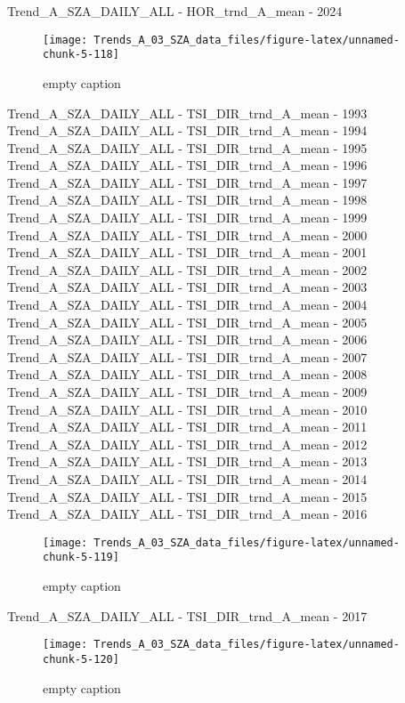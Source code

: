\documentclass[
  10pt,
  a4paper,oneside]{article}
\begin{document}
Trend\_A\_SZA\_DAILY\_ALL - HOR\_trnd\_A\_mean - 2024

\begin{figure}[!ht]

{\centering \texttt{[image: Trends\_A\_03\_SZA\_data\_files/figure-latex/unnamed-chunk-5-118]} 

}

\caption{ empty caption }\label{fig:unnamed-chunk-5-118}
\end{figure}

Trend\_A\_SZA\_DAILY\_ALL - TSI\_DIR\_trnd\_A\_mean - 1993
Trend\_A\_SZA\_DAILY\_ALL - TSI\_DIR\_trnd\_A\_mean - 1994
Trend\_A\_SZA\_DAILY\_ALL - TSI\_DIR\_trnd\_A\_mean - 1995
Trend\_A\_SZA\_DAILY\_ALL - TSI\_DIR\_trnd\_A\_mean - 1996
Trend\_A\_SZA\_DAILY\_ALL - TSI\_DIR\_trnd\_A\_mean - 1997
Trend\_A\_SZA\_DAILY\_ALL - TSI\_DIR\_trnd\_A\_mean - 1998
Trend\_A\_SZA\_DAILY\_ALL - TSI\_DIR\_trnd\_A\_mean - 1999
Trend\_A\_SZA\_DAILY\_ALL - TSI\_DIR\_trnd\_A\_mean - 2000
Trend\_A\_SZA\_DAILY\_ALL - TSI\_DIR\_trnd\_A\_mean - 2001
Trend\_A\_SZA\_DAILY\_ALL - TSI\_DIR\_trnd\_A\_mean - 2002
Trend\_A\_SZA\_DAILY\_ALL - TSI\_DIR\_trnd\_A\_mean - 2003
Trend\_A\_SZA\_DAILY\_ALL - TSI\_DIR\_trnd\_A\_mean - 2004
Trend\_A\_SZA\_DAILY\_ALL - TSI\_DIR\_trnd\_A\_mean - 2005
Trend\_A\_SZA\_DAILY\_ALL - TSI\_DIR\_trnd\_A\_mean - 2006
Trend\_A\_SZA\_DAILY\_ALL - TSI\_DIR\_trnd\_A\_mean - 2007
Trend\_A\_SZA\_DAILY\_ALL - TSI\_DIR\_trnd\_A\_mean - 2008
Trend\_A\_SZA\_DAILY\_ALL - TSI\_DIR\_trnd\_A\_mean - 2009
Trend\_A\_SZA\_DAILY\_ALL - TSI\_DIR\_trnd\_A\_mean - 2010
Trend\_A\_SZA\_DAILY\_ALL - TSI\_DIR\_trnd\_A\_mean - 2011
Trend\_A\_SZA\_DAILY\_ALL - TSI\_DIR\_trnd\_A\_mean - 2012
Trend\_A\_SZA\_DAILY\_ALL - TSI\_DIR\_trnd\_A\_mean - 2013
Trend\_A\_SZA\_DAILY\_ALL - TSI\_DIR\_trnd\_A\_mean - 2014
Trend\_A\_SZA\_DAILY\_ALL - TSI\_DIR\_trnd\_A\_mean - 2015
Trend\_A\_SZA\_DAILY\_ALL - TSI\_DIR\_trnd\_A\_mean - 2016

\begin{figure}[!ht]

{\centering \texttt{[image: Trends\_A\_03\_SZA\_data\_files/figure-latex/unnamed-chunk-5-119]} 

}

\caption{ empty caption }\label{fig:unnamed-chunk-5-119}
\end{figure}

Trend\_A\_SZA\_DAILY\_ALL - TSI\_DIR\_trnd\_A\_mean - 2017

\begin{figure}[!ht]

{\centering \texttt{[image: Trends\_A\_03\_SZA\_data\_files/figure-latex/unnamed-chunk-5-120]} 

}

\caption{ empty caption }\label{fig:unnamed-chunk-5-120}
\end{figure}
\end{document}
